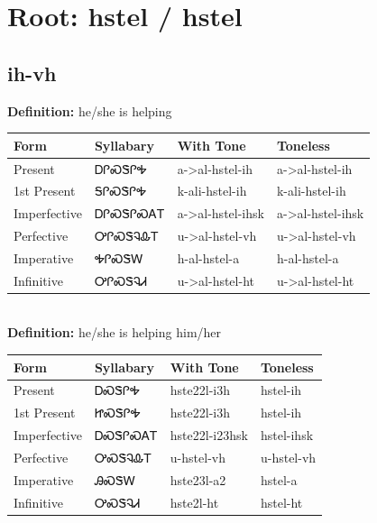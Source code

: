 \documentclass{article}%
\begin{document}
%
\normalsize%
\section*{Root: hstel / hstel}%
\subsection*{ih-vh}%
\textbf{Definition: }%
he/she is helping%
\\[0.5em]%
\begin{tabular}{|l|l|l|l|}%
\hline%
\textbf{Form}&\textbf{Syllabary}&\textbf{With Tone}&\textbf{Toneless}\\%
\hline%
Present&ᎠᎵᏍᏕᎵᎭ&a{-}>al{-}hstel{-}ih&a{-}>al{-}hstel{-}ih\\%
1st Present&ᎦᎵᏍᏕᎵᎭ&k{-}ali{-}hstel{-}ih&k{-}ali{-}hstel{-}ih\\%
Imperfective&ᎠᎵᏍᏕᎵᏍᎪᎢ&a{-}>al{-}hstel{-}ihsk&a{-}>al{-}hstel{-}ihsk\\%
Perfective&ᎤᎵᏍᏕᎸᎲᎢ&u{-}>al{-}hstel{-}vh&u{-}>al{-}hstel{-}vh\\%
Imperative&ᎭᎵᏍᏕᎳ&h{-}al{-}hstel{-}a&h{-}al{-}hstel{-}a\\%
Infinitive&ᎤᎵᏍᏕᎸᏗ&u{-}>al{-}hstel{-}ht&u{-}>al{-}hstel{-}ht\\%
\hline%
\end{tabular}%
\\[1em]%
\textbf{Definition: }%
he/she is helping him/her%
\\[0.5em]%
\begin{tabular}{|l|l|l|l|}%
\hline%
\textbf{Form}&\textbf{Syllabary}&\textbf{With Tone}&\textbf{Toneless}\\%
\hline%
Present&ᎠᏍᏕᎵᎭ&hste22l{-}i3h&hstel{-}ih\\%
1st Present&ᏥᏍᏕᎵᎭ&hste22l{-}i3h&hstel{-}ih\\%
Imperfective&ᎠᏍᏕᎵᏍᎪᎢ&hste22l{-}i23hsk&hstel{-}ihsk\\%
Perfective&ᎤᏍᏕᎸᎲᎢ&u{-}hstel{-}vh&u{-}hstel{-}vh\\%
Imperative&ᎯᏍᏕᎳ&hste23l{-}a2&hstel{-}a\\%
Infinitive&ᎤᏍᏕᎸᏗ&hste2l{-}ht&hstel{-}ht\\%
\hline%
\end{tabular}%
\\[1em]%
\end{document}
